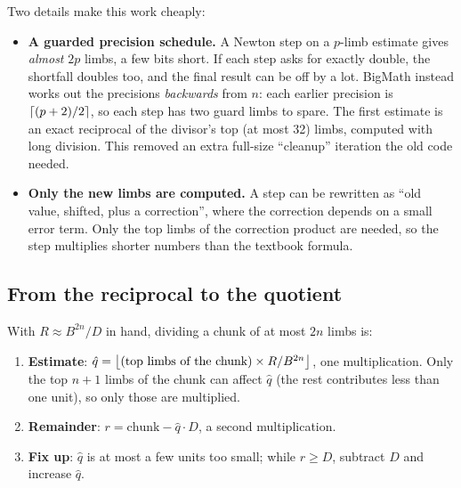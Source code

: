 Two details make this work cheaply:

\begin{itemize}
  \item \textbf{A guarded precision schedule.} A Newton step on a $p$-limb estimate gives
        \emph{almost} $2p$ limbs, a few bits short. If each step asks for exactly double, the
        shortfall doubles too, and the final result can be off by a lot. BigMath instead works
        out the precisions \emph{backwards} from $n$: each earlier precision is
        $\left\lceil (p + 2)/2 \right\rceil$, so each step has two guard limbs to spare. The first estimate is an
        exact reciprocal of the divisor's top (at most 32) limbs, computed with long division.
        This removed an extra full-size ``cleanup'' iteration the old code needed.
  \item \textbf{Only the new limbs are computed.} A step can be rewritten as
        ``old value, shifted, plus a correction'', where the correction depends on a small error
        term. Only the top limbs of the correction product are needed, so the step multiplies
        shorter numbers than the textbook formula.
\end{itemize}

\subsection{From the reciprocal to the quotient}

With $R \approx B^{2n}/D$ in hand, dividing a chunk of at most $2n$ limbs is:

\begin{enumerate}
  \item \textbf{Estimate}: $\hat q = \left\lfloor \text{(top limbs of the chunk)} \times R / B^{2n} \right\rfloor$,
        one multiplication. Only the top $n+1$ limbs of the chunk can affect $\hat q$ (the rest
        contributes less than one unit), so only those are multiplied.
  \item \textbf{Remainder}: $r = \text{chunk} - \hat q \cdot D$, a second multiplication.
  \item \textbf{Fix up}: $\hat q$ is at most a few units too small; while $r \ge D$, subtract $D$
        and increase $\hat q$.
\end{enumerate}

